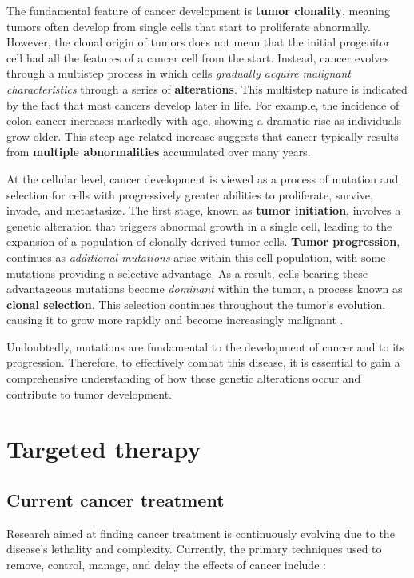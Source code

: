 The fundamental feature of cancer development is \textbf{tumor clonality}, meaning tumors often develop from single cells that start to proliferate abnormally. However, the clonal origin of tumors does not mean that the initial progenitor cell had all the features of a cancer cell from the start. Instead, cancer evolves through a multistep process in which cells \textit{gradually acquire malignant characteristics} through a series of \textbf{alterations}. This multistep nature is indicated by the fact that most cancers develop later in life. For example, the incidence of colon cancer increases markedly with age, showing a dramatic rise as individuals grow older. This steep age-related increase suggests that cancer typically results from \textbf{multiple abnormalities} accumulated over many years.

At the cellular level, cancer development is viewed as a process of mutation and selection for cells with progressively greater abilities to proliferate, survive, invade, and metastasize. The first stage, known as \textbf{tumor initiation}, involves a genetic alteration that triggers abnormal growth in a single cell, leading to the expansion of a population of clonally derived tumor cells. \textbf{Tumor progression}, continues as \textit{additional mutations} arise within this cell population, with some mutations providing a selective advantage. As a result, cells bearing these advantageous mutations become \textit{dominant} within the tumor, a process known as \textbf{clonal selection}. This selection continues throughout the tumor's evolution, causing it to grow more rapidly and become increasingly malignant \cite{nih_cancer_dev}.

Undoubtedly, mutations are fundamental to the development of cancer and to its progression. Therefore, to effectively combat this disease, it is essential to gain a comprehensive understanding of how these genetic alterations occur and contribute to tumor development.

\section{Targeted therapy}

\subsection{Current cancer treatment}

Research aimed at finding cancer treatment is continuously evolving due to the disease's lethality and complexity. Currently, the primary techniques used to remove, control, manage, and delay the effects of cancer include \cite{cancer_treat}:

